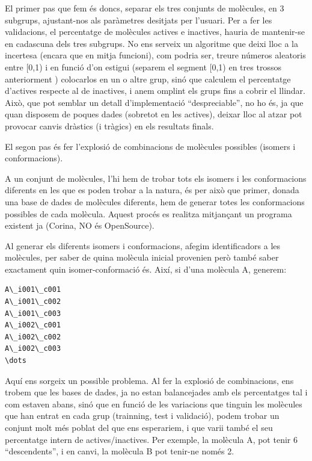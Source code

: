 \documentclass[titlepage,a4paper,12pt]{book}
\begin{document}
El primer pas que fem és doncs, separar els tres conjunts de molècules, en 3
subgrups, ajustant-nos als paràmetres desitjats per l'usuari.  Per a fer les
validacions, el percentatge de molècules actives e inactives, hauria de
mantenir-se en cadascuna dels tres subgrups. No ens serveix un algoritme que
deixi lloc a la incertesa (encara que en mitja funcioni), com podria ser, treure
números aleatoris entre [0,1) i en funció d'on estigui (separem el segment [0,1)
en tres trossos anteriorment ) colocarlos en un o altre grup, sinó que calculem
el percentatge d'actives respecte al de inactives, i anem omplint els grups fins
a cobrir el llindar.  Això, que pot semblar un detall d'implementació
``despreciable'', no ho és, ja que quan disposem de poques dades (sobretot en
les actives), deixar lloc al atzar pot provocar canvis dràstics (i tràgics) en
els resultats finals.


El segon pas és fer l'explosió de combinacions de molècules possibles (isomers i
conformacions).

A un conjunt de molècules, l'hi hem de trobar tots els isomers i les
conformacions diferents en les que es poden trobar a la natura, és per això que
primer, donada una base de dades de molècules diferents, hem de generar totes
les conformacions possibles de cada molècula.  Aquest procés es realitza
mitjançant un programa existent ja (Corina, NO és OpenSource).

Al generar els diferents isomers i conformacions, afegim identificadors a les
molècules, per saber de quina molècula inicial provenien però també saber
exactament quin isomer-conformació és.  Així, si d'una molècula A, generem:

\begin{verbatim}
A\_i001\_c001
A\_i001\_c002
A\_i001\_c003
A\_i002\_c001
A\_i002\_c002
A\_i002\_c003
\dots
\end{verbatim}


Aquí ens sorgeix un possible problema.  Al fer la explosió de combinacions, ens
trobem que les bases de dades, ja no estan balancejades amb els percentatges tal
i com estaven abans, sinó que en funció de les variacions que tinguin les
molècules que han entrat en cada grup (trainning, test i validació), podem
trobar un conjunt molt més poblat del que ens esperariem, i que varii també el
seu percentatge intern de actives/inactives. Per exemple, la molècula A, pot
tenir 6 ``descendents'', i en canvi, la molècula B pot tenir-ne només 2.
\end{document}
